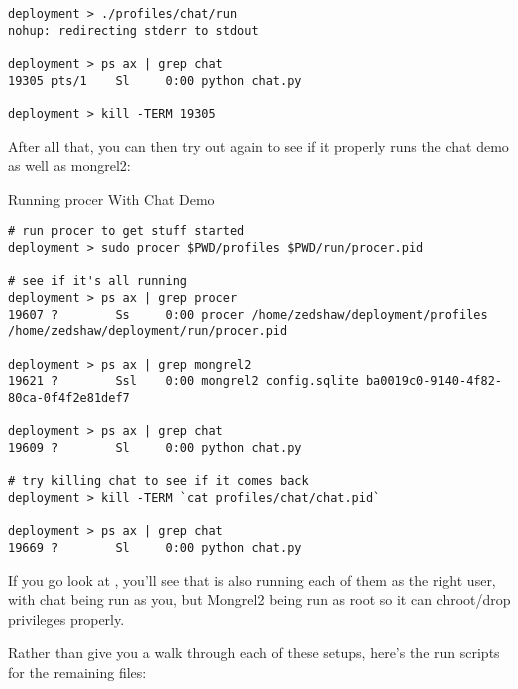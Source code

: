 \begin{lstlisting}
deployment > ./profiles/chat/run
nohup: redirecting stderr to stdout

deployment > ps ax | grep chat
19305 pts/1    Sl     0:00 python chat.py

deployment > kill -TERM 19305
\end{lstlisting}

After all that, you can then try out  again to see if it
properly runs the chat demo as well as mongrel2:

\begin{code}{Running procer With Chat Demo}
\begin{lstlisting}
# run procer to get stuff started
deployment > sudo procer $PWD/profiles $PWD/run/procer.pid

# see if it's all running
deployment > ps ax | grep procer
19607 ?        Ss     0:00 procer /home/zedshaw/deployment/profiles /home/zedshaw/deployment/run/procer.pid

deployment > ps ax | grep mongrel2
19621 ?        Ssl    0:00 mongrel2 config.sqlite ba0019c0-9140-4f82-80ca-0f4f2e81def7

deployment > ps ax | grep chat
19609 ?        Sl     0:00 python chat.py

# try killing chat to see if it comes back
deployment > kill -TERM `cat profiles/chat/chat.pid`

deployment > ps ax | grep chat
19669 ?        Sl     0:00 python chat.py
\end{lstlisting}
\end{code}

If you go look at , you'll see that 
is also running each of them as the right user, with chat being run
as you, but Mongrel2 being run as root so it can chroot/drop privileges properly.

Rather than give you a walk through each of these setups, here's the
run scripts for the remaining files:

